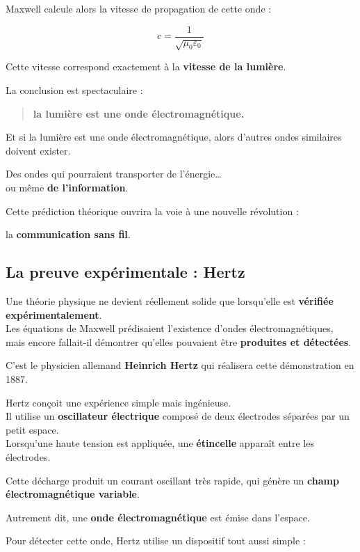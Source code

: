 \documentclass[
  french,
]{article}
\begin{document}
Maxwell calcule alors la vitesse de propagation de cette onde :

\[
c = \frac{1}{\sqrt{\mu_0 \varepsilon_0}}
\]

Cette vitesse correspond exactement à la \textbf{vitesse de la lumière}.

La conclusion est spectaculaire :

\begin{quote}
\textbf{la lumière est une onde électromagnétique.}
\end{quote}

Et si la lumière est une onde électromagnétique, alors d'autres ondes
similaires doivent exister.

Des ondes qui pourraient transporter de l'énergie\ldots{}\\
ou même \textbf{de l'information}.

Cette prédiction théorique ouvrira la voie à une nouvelle révolution :

la \textbf{communication sans fil}.

\subsection{La preuve expérimentale :
Hertz}\label{la-preuve-expuxe9rimentale-hertz}

Une théorie physique ne devient réellement solide que lorsqu'elle est
\textbf{vérifiée expérimentalement}.\\
Les équations de Maxwell prédisaient l'existence d'ondes
électromagnétiques, mais encore fallait-il démontrer qu'elles pouvaient
être \textbf{produites et détectées}.

C'est le physicien allemand \textbf{Heinrich Hertz} qui réalisera cette
démonstration en 1887.

Hertz conçoit une expérience simple mais ingénieuse.\\
Il utilise un \textbf{oscillateur électrique} composé de deux électrodes
séparées par un petit espace.\\
Lorsqu'une haute tension est appliquée, une \textbf{étincelle} apparaît
entre les électrodes.

Cette décharge produit un courant oscillant très rapide, qui génère un
\textbf{champ électromagnétique variable}.

Autrement dit, une \textbf{onde électromagnétique} est émise dans
l'espace.

Pour détecter cette onde, Hertz utilise un dispositif tout aussi simple
:
\end{document}

